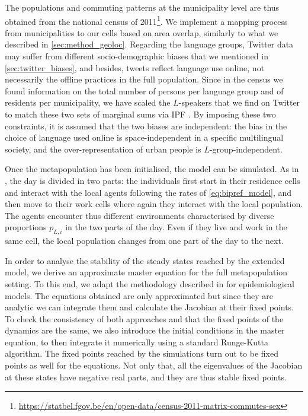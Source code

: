 \documentclass[../thesis.tex]{subfiles}
\begin{document}
The populations and commuting patterns at the municipality level are thus obtained from
the national census of
2011\footnote{\url{https://statbel.fgov.be/en/open-data/census-2011-matrix-commutes-sex}}.
We implement a mapping process from municipalities to our cells based on area overlap,
similarly to what we described in \cref{sec:method_geoloc}. Regarding the language
groups, Twitter data may suffer from different socio-demographic biases that we
mentioned in \cref{sec:twitter_biases}, and besides, tweets reflect language use online,
not necessarily the offline practices in the full population. Since in the census we
found information on the total number of persons per language group and of residents per
municipality, we have scaled the $L$-speakers that we find on Twitter to match these two
sets of marginal sums via \ac{IPF}
\cite{DemingLeastSquares1940,FienbergIterativeProcedure1970}. By imposing these two
constraints, it is assumed that the two biases are independent: the bias in the choice
of language used online is space-independent in a specific multilingual society, and the
over-representation of urban people is $L$-group-independent.

Once the metapopulation has been initialised, the model can be simulated. As in
\cite{Fernandez-GraciaVoterModel2014}, the day is divided in two parts: the individuals
first start in their residence cells and interact with the local agents following the
rates of \cref{eq:bipref_model}, and then move to their work cells where again they
interact with the local population. The agents encounter thus different environments
characterised by diverse proportions $p_{L,i}$ in the two parts of the day. Even if they
live and work in the same cell, the local population changes from one part of the day to
the next.

In order to analyse the stability of the steady states reached by the extended model, we
derive an approximate master equation for the full metapopulation setting. To this end,
we adapt the methodology described in
\cite{SattenspielStructuredEpidemic1995,BalcanModelingSpatial2010} for epidemiological
models. The equations obtained are only
approximated but since they are analytic we can integrate them and calculate the
Jacobian at their fixed points. To check the consistency of both approaches and that the
fixed points of the dynamics are the same, we also introduce the initial conditions in
the master equation, to then integrate it numerically using a standard Runge-Kutta
algorithm. The fixed points reached by the simulations turn out to be fixed points as
well for the equations. Not only that, all the eigenvalues of the Jacobian at these
states have negative real parts, and they are thus stable fixed points.
\end{document}
